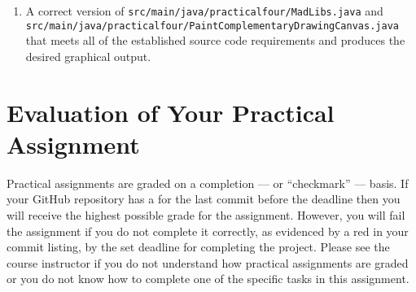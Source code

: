 \documentclass[11pt]{article}
\newcommand{\mainprogramsource}{\lstinline{src/main/java/practicalfour/MadLibs.java}}
\newcommand{\secondprogramsource}{\lstinline{src/main/java/practicalfour/PaintComplementaryDrawingCanvas.java}}
\newcommand{\checkmark}{\ding{51}}
\newcommand{\naughtmark}{\ding{55}}
\begin{document}
\begin{enumerate}

\setlength{\itemsep}{0in}

\item A correct version of \mainprogramsource{} and \secondprogramsource{} that meets all of the established source code
  requirements and produces the desired graphical output.

\end{enumerate}

\section*{Evaluation of Your Practical Assignment}

Practical assignments are graded on a completion --- or ``checkmark'' --- basis.
If your GitHub repository has a \checkmark{} for the last commit before the
deadline then you will receive the highest possible grade for the assignment.
However, you will fail the assignment if you do not complete it correctly, as
evidenced by a red \naughtmark{} in your commit listing, by the set deadline for
completing the project. Please see the course instructor if you do not
understand how practical assignments are graded or you do not know how to
complete one of the specific tasks in this assignment.


\end{document}
